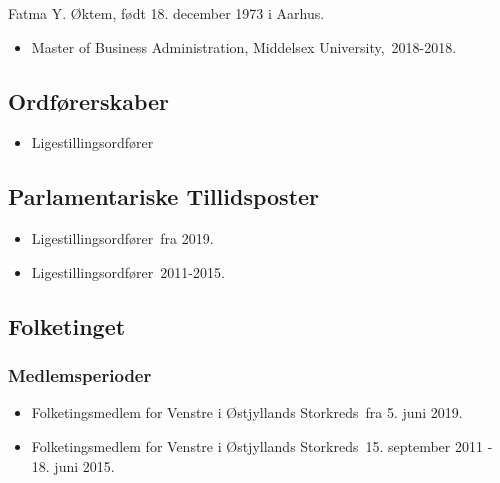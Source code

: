\documentclass[11pt, a4paper]{awesome-cv}
\begin{document}
\makecvheader[R]
\makelettertitle
\begin{cvletter}
Fatma Y. Øktem, født 18. december 1973 i Aarhus.

\begin{itemize}
\item Master of Business Administration, Middelsex University, 2018-2018.
\end{itemize}
\subsection*{Ordførerskaber}
\begin{itemize}
\item Ligestillingsordfører
\end{itemize}
\subsection*{Parlamentariske Tillidsposter}
\begin{itemize}
\item Ligestillingsordfører fra 2019.
\item Ligestillingsordfører 2011-2015.
\end{itemize}
\subsection*{Folketinget}
\subsubsection*{Medlemsperioder}
\begin{itemize}
\item Folketingsmedlem for Venstre i Østjyllands Storkreds fra 5. juni 2019.
\item Folketingsmedlem for Venstre i Østjyllands Storkreds 15. september 2011 - 18. juni 2015.
\end{itemize}

\end{cvletter}
\end{document}
